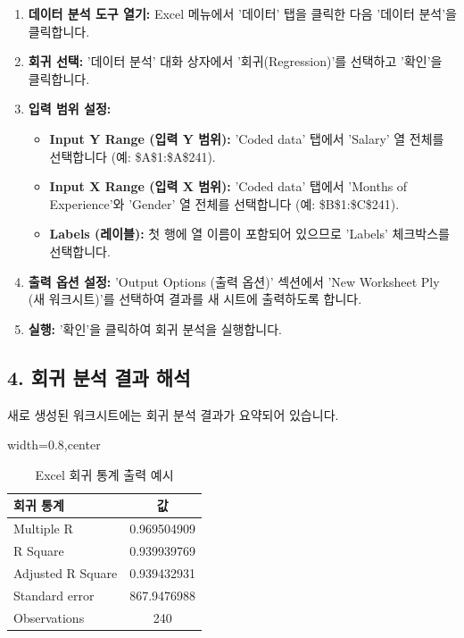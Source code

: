\documentclass[11pt,a4paper]{article}
\theoremstyle{definition}
\begin{document}
\begin{enumerate}
    \item \textbf{데이터 분석 도구 열기:} Excel 메뉴에서 '데이터' 탭을 클릭한 다음 '데이터 분석'을 클릭합니다.
    \item \textbf{회귀 선택:} '데이터 분석' 대화 상자에서 '회귀(Regression)'를 선택하고 '확인'을 클릭합니다.
    \item \textbf{입력 범위 설정:}
    \begin{itemize}
        \item \textbf{Input Y Range (입력 Y 범위):} 'Coded data' 탭에서 'Salary' 열 전체를 선택합니다 (예: \$A\$1:\$A\$241).
        \item \textbf{Input X Range (입력 X 범위):} 'Coded data' 탭에서 'Months of Experience'와 'Gender' 열 전체를 선택합니다 (예: \$B\$1:\$C\$241).
        \item \textbf{Labels (레이블):} 첫 행에 열 이름이 포함되어 있으므로 'Labels' 체크박스를 선택합니다.
    \end{itemize}
    \item \textbf{출력 옵션 설정:} 'Output Options (출력 옵션)' 섹션에서 'New Worksheet Ply (새 워크시트)'를 선택하여 결과를 새 시트에 출력하도록 합니다.
    \item \textbf{실행:} '확인'을 클릭하여 회귀 분석을 실행합니다.
\end{enumerate}

\subsection{4. 회귀 분석 결과 해석}
새로 생성된 워크시트에는 회귀 분석 결과가 요약되어 있습니다.

\begin{table}[htbp]
\centering
\caption{Excel 회귀 통계 출력 예시}
\label{tab:excel_reg_stats}
\begin{adjustbox}{width=0.8\textwidth,center}
\begin{tabular}{lc}
\toprule
\textbf{회귀 통계} & \textbf{값} \\
\midrule
Multiple R & 0.969504909 \\
R Square & 0.939939769 \\
Adjusted R Square & 0.939432931 \\
Standard error & 867.9476988 \\
Observations & 240 \\
\bottomrule
\end{tabular}
\end{adjustbox}
\end{table}
\end{document}
